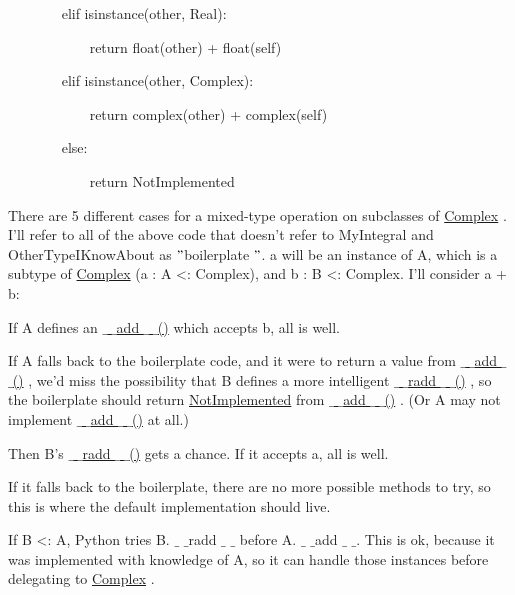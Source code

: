 \documentclass[a4paper,12pt]{report}
\begin{document}
\noindent 
~~~~~~~ elif isinstance(other, Real): \par
\noindent 
~~~~~~~~~~~ return float(other) + float(self) \par
\noindent 
~~~~~~~ elif isinstance(other, Complex): \par
\noindent 
~~~~~~~~~~~ return complex(other) + complex(self) \par
\noindent 
~~~~~~~ else: \par
\noindent 
~~~~~~~~~~~ return NotImplemented \par
\noindent 
There are 5 different cases for a mixed-type operation on subclasses of \href{https://docs.python.org/2/library/numbers.html}{Complex}
. I’ll refer to all of the above code that doesn’t refer to MyIntegral and OtherTypeIKnowAbout as  $ " $boilerplate $ " $. a will be an instance of A, which is a subtype of \href{https://docs.python.org/2/library/numbers.html}{Complex}
 (a : A <: Complex), and b : B <: Complex. I’ll consider a + b: \par
\begin{myEnumerate}[label*=\arabic*.]
\item If A defines an \href{https://docs.python.org/2/reference/datamodel.html}{ $  \_  $ $  \_  $add $  \_  $ $  \_  $()}
 which accepts b, all is well. \par
\item If A falls back to the boilerplate code, and it were to return a value from \href{https://docs.python.org/2/reference/datamodel.html}{ $  \_  $ $  \_  $add $  \_  $ $  \_  $()}
, we’d miss the possibility that B defines a more intelligent \href{https://docs.python.org/2/reference/datamodel.html}{ $  \_  $ $  \_  $radd $  \_  $ $  \_  $()}
, so the boilerplate should return \href{https://docs.python.org/2/library/constants.html}{NotImplemented}
 from \href{https://docs.python.org/2/reference/datamodel.html}{ $  \_  $ $  \_  $add $  \_  $ $  \_  $()}
. (Or A may not implement \href{https://docs.python.org/2/reference/datamodel.html}{ $  \_  $ $  \_  $add $  \_  $ $  \_  $()}
 at all.) \par
\item Then B’s \href{https://docs.python.org/2/reference/datamodel.html}{ $  \_  $ $  \_  $radd $  \_  $ $  \_  $()}
 gets a chance. If it accepts a, all is well. \par
\item If it falls back to the boilerplate, there are no more possible methods to try, so this is where the default implementation should live. \par
\item If B <: A, Python tries B. $  \_  $ $  \_  $radd $  \_  $ $  \_  $ before A. $  \_  $ $  \_  $add $  \_  $ $  \_  $. This is ok, because it was implemented with knowledge of A, so it can handle those instances before delegating to \href{https://docs.python.org/2/library/numbers.html}{Complex}
.\end{myEnumerate}
\end{document}
